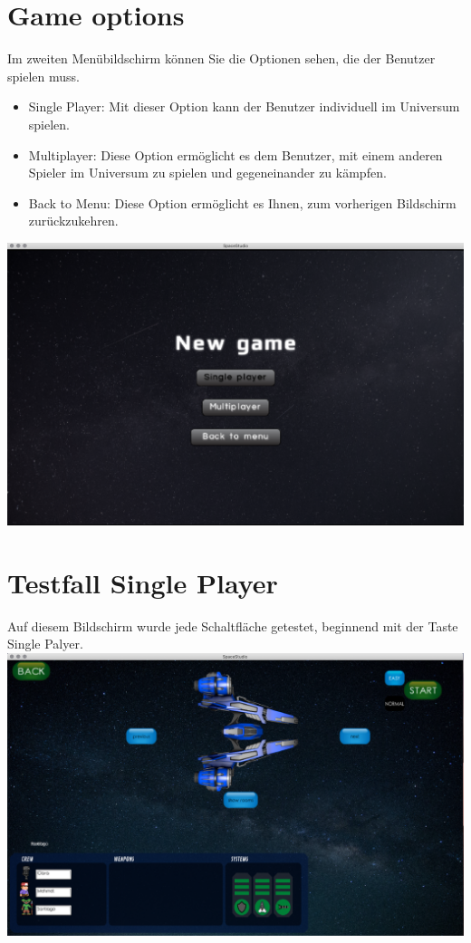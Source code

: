 \documentclass[11pt]{article}
\begin{document}
\section{Game options}
Im zweiten Menübildschirm können Sie die Optionen sehen, die der Benutzer spielen muss.
\begin{itemize}
\item Single Player: Mit dieser Option kann der Benutzer individuell im Universum spielen.
\item Multiplayer: Diese Option ermöglicht es dem Benutzer, mit einem anderen Spieler im Universum zu spielen und gegeneinander zu kämpfen.
\item Back to Menu: Diese Option ermöglicht es Ihnen, zum vorherigen Bildschirm zurückzukehren.
\end{itemize}
\includegraphics[scale=0.2]{TestProtocolBilder/menuScreenTwo.png}

\section{Testfall Single Player}
Auf diesem Bildschirm wurde jede Schaltfläche getestet, beginnend mit der Taste Single Palyer.\\
\includegraphics[scale=0.2]{TestProtocolBilder/selecShipScreen.png}
\end{document}
